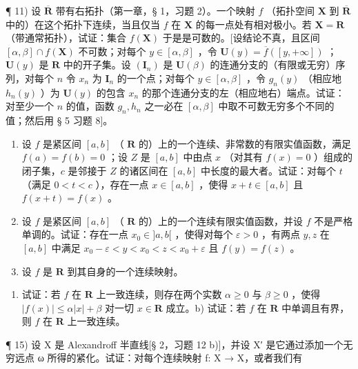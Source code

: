 ¶ 11) 设 \(\overline{\mathbf{R}}\) 带有右拓扑（第一章，§ 1，习题 2）。一个映射 \(f\) （拓扑空间 \(\mathbf{X}\) 到 \(\overline{\mathbf{R}}\) 中的）在这个拓扑下连续，当且仅当 \(f\) 在 \(\mathbf{X}\) 的每一点处有相对极小。若 \(\mathbf{X} = \mathbf{R}\) （带通常拓扑），试证：集合 \(f(\mathbf{X})\) 于是是可数的。{[}设结论不真，且区间 \([\alpha, \beta] \cap f(\mathbf{X})\) 不可数；对每个 \(y \in [\alpha, \beta]\) ，令 \(\mathbf{U}(y) = \overline{f}([y, +\infty])\) ；\(\mathbf{U}(y)\) 是 \(\mathbf{R}\) 中的开子集。设 \((\mathbf{I}_n)\) 是 \(\mathbf{U}(\beta)\) 的连通分支的（有限或无穷）序列，对每个 \(n\) 令 \(x_n\) 为 \(\mathbf{I}_n\) 的一个点；对每个 \(y \in [\alpha, \beta]\) ，令 \(g_n(y)\) （相应地 \(h_n(y) \) ）为 \(\mathbf{U}(y)\) 的包含 \(x_n\) 的那个连通分支的左（相应地右）端点。试证：对至少一个 \(n\) 的值，函数 \(g_n, h_n\) 之一必在 \([\alpha, \beta]\) 中取不可数无穷多个不同的值；然后用 § 5 习题 8{]}。

\begin{enumerate}
\def\labelenumi{\arabic{enumi})}
\setcounter{enumi}{11}
\item
设 \(f\) 是紧区间 \([a, b]\) （ \(\mathbf{R}\) 的）上的一个连续、非常数的有限实值函数，满足 \(f(a) = f(b) = 0\) ；设 \(Z\) 是 \([a, b]\) 中由点 \(x\) （对其有 \(f(x) = 0\) ）组成的闭子集，\(c\) 是邻接于 \(Z\) 的诸区间在 \([a, b]\) 中长度的最大者。试证：对每个 \(t\) （满足 \(0 < t < c\) ），存在一点 \(x \in [a, b]\) ，使得 \(x + t \in [a, b]\) 且 \(f(x + t) = f(x)\) 。
\item
设 \(f\) 是紧区间 \([a, b]\) （ \(\mathbf{R}\) 的）上的一个连续有限实值函数，并设 \(f\) 不是严格单调的。试证：存在一点 \(x_0 \in ]a, b[\) ，使得对每个 \(\varepsilon > 0\) ，有两点 \(y, z\) 在 \([a, b]\) 中满足 \(x_0 - \varepsilon < y < x_0 < z < x_0 + \varepsilon\) 且 \(f(y) = f(z)\) 。
\item
设 \(f\) 是 \(\mathbf{R}\) 到其自身的一个连续映射。
\end{enumerate}

\begin{enumerate}
\def\labelenumi{\alph{enumi})}
\tightlist
\item
试证：若 \(f\) 在 \(\mathbf{R}\) 上一致连续，则存在两个实数 \(\alpha \geqslant 0\) 与 \(\beta \geqslant 0\) ，使得 \(|f(x)| \leqslant \alpha |x| + \beta\) 对一切 \(x \in \mathbf{R}\) 成立。b) 试证：若 \(f\) 在 \(\mathbf{R}\) 中单调且有界，则 \(f\) 在 \(\mathbf{R}\) 上一致连续。
\end{enumerate}

¶ 15) 设 X 是 Alexandroff 半直线{[}§ 2，习题 12 b){]}，并设 X′ 是它通过添加一个无穷远点 ω 所得的紧化。试证：对每个连续映射 f: X → X，或者我们有

